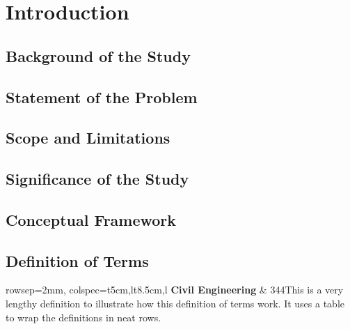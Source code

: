 \chapter{Introduction}\label{ch:1}

\section{Background of the Study}\label{sec:1-bos}

\section{Statement of the Problem}\label{sec:1-sop}

\section{Scope and Limitations}\label{sec:1-sal}

\section{Significance of the Study}\label{sec:1-sots}

\section{Conceptual Framework}\label{sec:1-cf}

\section{Definition of Terms}\label{sec:1-dot}
\vspace*{-2em}
\begin{longtblr}[
	entry=none,
	label=none
	]{rowsep=2mm, colspec={t{5cm,l}t{8.5cm,l}}}
	\textbf{Civil Engineering} & 344This is a very lengthy definition to illustrate how this definition of terms work. It uses a table to wrap the definitions in neat rows. \\
\end{longtblr}

